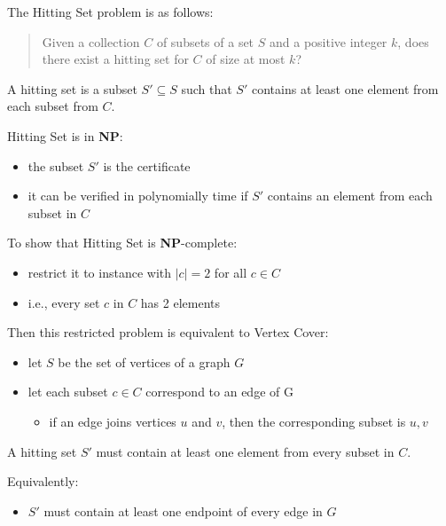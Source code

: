 \documentclass[11pt]{article}
\providecommand{\tightlist}{%
      \setlength{\itemsep}{0pt}\setlength{\parskip}{0pt}}
\begin{document}
The Hitting Set problem is as follows:

\begin{quote}
Given a collection \(C\) of subsets of a set \(S\) and a positive
integer \(k\), does there exist a hitting set for \(C\) of size at most
\(k\)?
\end{quote}

A hitting set is a subset \(S' \subseteq S\) such that \(S'\) contains
at least one element from each subset from \(C\).

Hitting Set is in \textbf{NP}:

\begin{itemize}
\tightlist
\item
  the subset \(S'\) is the certificate
\item
  it can be verified in polynomially time if \(S'\) contains an element
  from each subset in \(C\)
\end{itemize}

To show that Hitting Set is \textbf{NP}-complete:

\begin{itemize}
\tightlist
\item
  restrict it to instance with \(|c| = 2\) for all \(c \in C\)
\item
  i.e., every set \(c\) in \(C\) has 2 elements
\end{itemize}

Then this restricted problem is equivalent to Vertex Cover:

\begin{itemize}
\tightlist
\item
  let \(S\) be the set of vertices of a graph \(G\)
\item
  let each subset \(c \in C\) correspond to an edge of G

  \begin{itemize}
  \tightlist
  \item
    if an edge joins vertices \(u\) and \(v\), then the corresponding
    subset is \({u,v}\)
  \end{itemize}
\end{itemize}

A hitting set \(S'\) must contain at least one element from every subset
in \(C\).

Equivalently:

\begin{itemize}
\tightlist
\item
  \(S'\) must contain at least one endpoint of every edge in \(G\)
\end{itemize}
\end{document}
